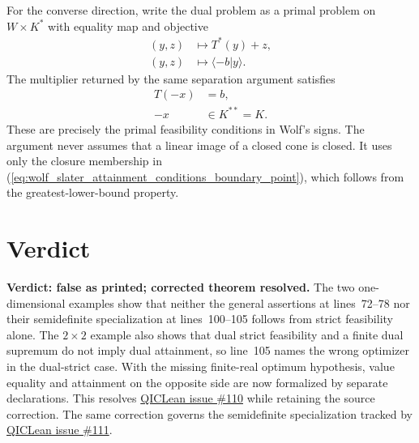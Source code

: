 \documentclass{article}
\begin{document}
For the converse direction, write the dual problem as a primal problem on
$W\times K^*$ with equality map and objective
\begin{align}
  (y,z)
    &\longmapsto T^*(y)+z,
  \label{eq:wolf_slater_attainment_conditions_converse_equality_map}\\
  (y,z)
    &\longmapsto\langle-b|y\rangle.
  \label{eq:wolf_slater_attainment_conditions_converse_objective}
\end{align}
The multiplier returned by the same separation argument satisfies
\begin{align}
  T(-x)
    &=b,
  \label{eq:wolf_slater_attainment_conditions_converse_constraint}\\
  -x
    &\in K^{**}=K.
  \label{eq:wolf_slater_attainment_conditions_converse_cone_membership}
\end{align}
These are precisely the primal feasibility conditions in Wolf's signs. The
argument never assumes that a linear image of a closed cone is closed. It uses
only the closure membership in
(\ref{eq:wolf_slater_attainment_conditions_boundary_point}), which follows
from the greatest-lower-bound property.

\section{Verdict}

\textbf{Verdict: false as printed; corrected theorem resolved.} The two
one-dimensional examples show that neither the general assertions at
lines~72--78 nor their semidefinite specialization at lines~100--105 follows
from strict feasibility alone. The $2\times2$ example also shows that dual
strict feasibility and a finite dual supremum do not imply dual attainment, so
line~105 names the wrong optimizer in the dual-strict case. With the missing
finite-real optimum hypothesis, value equality and attainment on the opposite
side are now formalized by separate declarations. This resolves
\href{https://github.com/LionSR/QICLean/issues/110}{QICLean issue \#110} while
retaining the source correction. The same correction governs the semidefinite
specialization tracked by
\href{https://github.com/LionSR/QICLean/issues/111}{QICLean issue \#111}.



\end{document}
